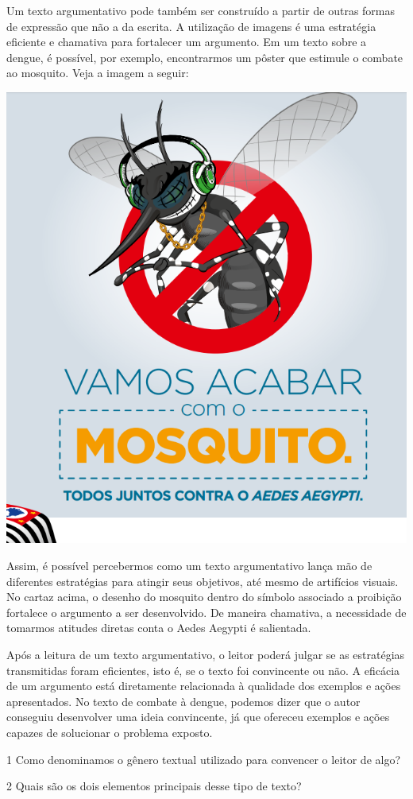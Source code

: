 {Um texto argumentativo pode também ser construído a partir de outras
formas de expressão que não a da escrita. A utilização de imagens é uma
estratégia eficiente e chamativa para fortalecer um argumento. Em um
texto sobre a dengue, é possível, por exemplo, encontrarmos um pôster
que estimule o combate ao mosquito. Veja a imagem a seguir:

\includegraphics[width=.5\textwidth]{./imgs/img11.png}

Assim, é possível percebermos como um texto argumentativo lança mão de
diferentes estratégias para atingir seus objetivos, até mesmo de
artifícios visuais. No cartaz acima, o desenho do mosquito dentro do
símbolo associado a proibição fortalece o argumento a ser desenvolvido.
De maneira chamativa, a necessidade de tomarmos atitudes diretas conta o
Aedes Aegypti é salientada.

Após a leitura de um texto argumentativo, o leitor poderá julgar se as
estratégias transmitidas foram eficientes, isto é, se o texto foi
convincente ou não. A eficácia de um argumento está diretamente
relacionada à qualidade dos exemplos e ações apresentados. No texto de
combate à dengue, podemos dizer que o autor conseguiu desenvolver uma
ideia convincente, já que ofereceu exemplos e ações capazes de
solucionar o problema exposto.}


\num{1} Como denominamos o gênero textual utilizado para convencer o leitor
de algo?



\num{2} Quais são os dois elementos principais desse tipo de texto?



